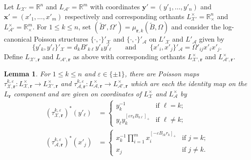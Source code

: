 \documentclass{amsart}
\newtheorem{lemma}[theorem]{Lemma}
\numberwithin{equation}{section}
\newcommand{\bfr}{{\boldsymbol{r}}}
\newcommand{\bfx}{{\boldsymbol{x}}}
\newcommand{\bfy}{{\boldsymbol{y}}}
\newcommand{\cA}{\mathcal{A}}
\newcommand{\cX}{\mathcal{X}}
\newcommand{\RR}{\mathbb{R}}
\begin{document}
Let $L_{\cX'}=\RR^n$ and $L_{\cA'}=\RR^m$ with coordinates $\bfy'=(y'_1,\ldots,y'_n)$ and $\bfx'=(x'_1,\ldots,x'_m)$ respectively and corresponding orthants $L^\times_{\cX'}=\RR_\times^n$ and $L^\times_{\cA'}=\RR_\times^m$.
For $1\le k\le n$, set $(\tilde B',\Omega')=\mu_{\bfr,k}(\tilde B,\Omega)$ and consider the log-canonical Poisson structures $\{\cdot,\cdot\}'_\cX$ and $\{\cdot,\cdot\}'_\cA$ on $L'_\cX$ and $L'_\cA$ given by
\begin{equation}
  \label{eq:brackets2}
  \{y'_k,y'_\ell\}'_\cX=d_kB'_{k\ell}y'_ky'_\ell\qquad\text{and}\qquad\{x'_i,x'_j\}'_\cA=\Omega'_{ij}x'_ix'_j.
\end{equation}
Define $L_{\cX',\bfr}$ and $L_{\cA',\bfr}$ as above with corresponding orthants $L^\times_{\cX',\bfr}$ and $L^\times_{\cA',\bfr}$.
\begin{lemma}
  \label{le:tropical cluster transformations}
  For $1\le k\le n$ and $\varepsilon\in\{\pm1\}$, there are Poisson maps $\tau_{\cX,\bfr}^{k,\varepsilon}:L^\times_{\cX,\bfr}\to L^\times_{\cX',\bfr}$ and $\tau_{\cA,\bfr}^{k,\varepsilon}:L^\times_{\cA,\bfr}\to L^\times_{\cA',\bfr}$ which are each the identity map on the $L_\bfr$ component and are given on coordinates of $L^\times_\cX$ and $L^\times_\cA$ by
  \begin{align}
    \label{eq:tropical X transformation}
    (\tau_{\cX,\bfr}^{k,\varepsilon})^*(y'_\ell)
    &=\begin{cases} 
      y_k^{-1} & \text{if $\ell=k$;}\\ 
      y_\ell y_k^{[\varepsilon r_kB_{k\ell}]_+} & \text{if $\ell\ne k$;}
    \end{cases}\\
    \label{eq:tropical A transformation}
    (\tau_{\cA,\bfr}^{k,\varepsilon})^*(x'_j)
    &=\begin{cases} 
      x_k^{-1}\prod\limits_{i=1}^m x_i^{[-\varepsilon B_{ik}r_k]_+} & \text{if $j=k$;}\\
      x_j & \text{if $j\ne k$.}
    \end{cases}
  \end{align}
\end{lemma}
\end{document}
